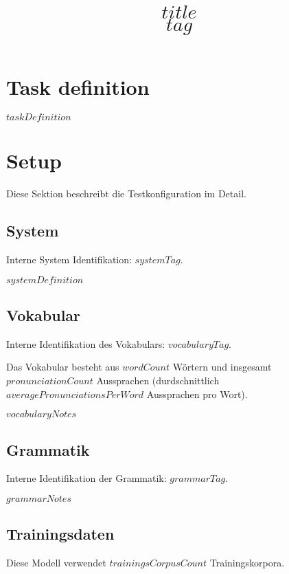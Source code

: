 \documentclass[a4paper,10pt,bibtotoc]{scrartcl}
\title{$title$\\$tag$}
\begin{document}

\maketitle

\begin{multicols}{2}

\tableofcontents


\section{Task definition}
$taskDefinition$

\section{Setup}
\label{sec:Setup}

Diese Sektion beschreibt die Testkonfiguration im Detail.

\subsection{System}
\label{sec:System}

Interne System Identifikation: $systemTag$.

$systemDefinition$

\subsection{Vokabular}

Interne Identifikation des Vokabulars: $vocabularyTag$.


Das Vokabular besteht aus $wordCount$ Wörtern und insgesamt $pronunciationCount$ Aussprachen (durdschnittlich $averagePronunciationsPerWord$ Aussprachen pro Wort).

$vocabularyNotes$

\subsection{Grammatik}

Interne Identifikation der Grammatik: $grammarTag$.

$grammarNotes$

\subsection{Trainingsdaten}

Diese Modell verwendet $trainingsCorpusCount$ Trainingskorpora.


\end{multicols}
\end{document}
